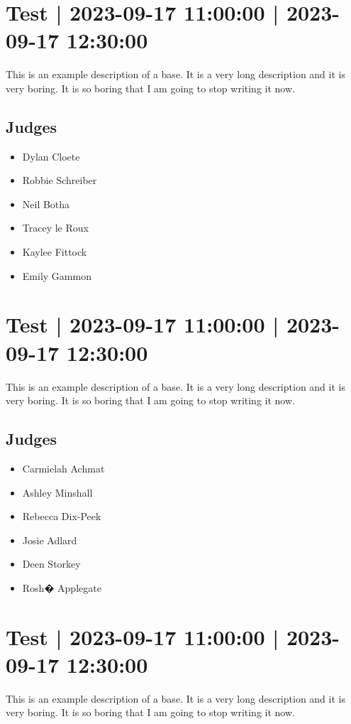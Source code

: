 \documentclass[10pt]{article}
\begin{document}
			\setcounter{section}{44}
	\section{Test | 2023-09-17 11:00:00 | 2023-09-17 12:30:00}
	This is an example description of a base. It is a very long description and it is very boring. It is so boring that I am going to stop writing it now.

	\subsection*{Judges}
	\begin{itemize}

			\item Dylan Cloete
			\item Robbie Schreiber
			\item Neil Botha
			\item Tracey le Roux
			\item Kaylee Fittock
			\item Emily Gammon
		\end{itemize}

			\setcounter{section}{45}
	\section{Test | 2023-09-17 11:00:00 | 2023-09-17 12:30:00}
	This is an example description of a base. It is a very long description and it is very boring. It is so boring that I am going to stop writing it now.

	\subsection*{Judges}
	\begin{itemize}

			\item Carmielah Achmat
			\item Ashley Minshall
			\item Rebecca Dix-Peek
			\item Josie Adlard
			\item Deen Storkey
			\item Rosh� Applegate
		\end{itemize}

			\setcounter{section}{46}
	\section{Test | 2023-09-17 11:00:00 | 2023-09-17 12:30:00}
	This is an example description of a base. It is a very long description and it is very boring. It is so boring that I am going to stop writing it now.
\end{document}

